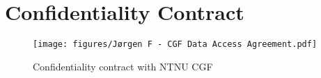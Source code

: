 \chapter{Confidentiality Contract}
\label{app:conf}

\begin{figure}[!h]
    \centering
    \texttt{[image: figures/Jørgen F - CGF Data Access Agreement.pdf]}
    \caption{Confidentiality contract with NTNU CGF}
    \label{fig:agreement}
\end{figure}